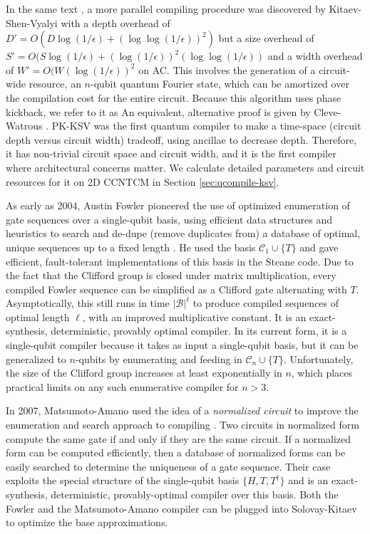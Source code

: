 In the same text \cite{Kitaev2002},
a more parallel compiling procedure was discovered by Kitaev-Shen-Vyalyi
with a depth overhead of $D' = O(D\log(1/\epsilon) + (\log\log(1/\epsilon))^2)$ but
a size overhead of $S' = O(S\log(1/\epsilon) + (\log(1/\epsilon))^2 (\log\log(1/\epsilon))$
and a width overhead of $W' = O(W(\log(1/\epsilon))^2$
on \textsf{AC}.
This involves the generation of a circuit-wide resource,
an $n$-qubit quantum Fourier state, which can be amortized over the compilation
cost for the entire circuit. Because this algorithm uses phase kickback,
we refer to it as 
An equivalent, alternative proof is given by Cleve-Watrous \cite{Cleve2000}.
PK-KSV was the first quantum compiler to make a time-space (circuit depth
versus circuit width) tradeoff,
using ancillae to decrease depth. Therefore, it has non-trivial circuit space
and circuit width, and it is the first compiler where architectural concerns
matter.
We calculate detailed parameters and circuit resources for it on
\textsf{2D CCNTCM} in Section \ref{sec:qcompile-ksv}.


As early as 2004, Austin Fowler pioneered the use of optimized enumeration
of gate sequences over a single-qubit basis, using efficient data structures
and heuristics to search and de-dupe (remove duplicates from) a database of optimal, unique
sequences up to
a fixed length \cite{Fowler2011}. He used the basis $\mathcal{C}_1 \cup \{ T \}$
and gave efficient, fault-tolerant implementations of this basis in the
Steane code. Due to the fact that the Clifford group is closed under
matrix multiplication, every compiled Fowler sequence can be simplified as a
Clifford gate alternating with $T$. Asymptotically, this still runs in time
$|\mathcal{B}|^\ell$ to produce compiled sequences of optimal length $\ell$,
with an improved multiplicative constant.
It is an exact-synthesis, deterministic, provably optimal compiler.
In its current form, it is a single-qubit compiler because it takes as input
a single-qubit basis, but it can be generalized to $n$-qubits by enumerating
and feeding in $\mathcal{C}_n \cup \{T\}$. Unfortunately, the size of the
Clifford group increases at least exponentially in $n$, which places practical
limits on any such enumerative compiler for $n > 3$.

In 2007, Matsumoto-Amano used the idea of a \emph{normalized circuit} to
improve the enumeration and search approach to compiling \cite{Matsumoto2008}. Two circuits in
normalized form compute the same gate if and only if they are the same
circuit. If a normalized form can be computed efficiently, then a
database of normalized forms can be easily searched to determine the
uniqueness of a gate sequence. Their case exploits the special structure
of the single-qubit basis $\{H,T,T^{\dagger}\}$ and is an exact-synthesis,
deterministic, provably-optimal compiler over this basis. Both the Fowler
and the Matsumoto-Amano compiler can be plugged into Solovay-Kitaev to
optimize the base approximations.


